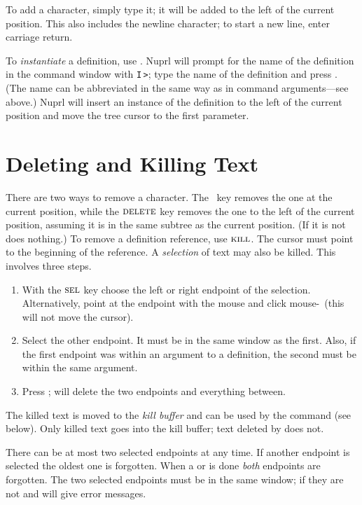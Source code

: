 {}To add a character, simply type it; it will be added to the left of the
current position.
This also includes the newline character; to start a new line, enter
carriage return.

To {\em instantiate}{} a definition, use \INS.  Nuprl will prompt for the name of
the definition in the command window with {\tt I$\,$>}; type the name of the definition
and press \CR.  (The name can be abbreviated in the same way as in command
arguments---see above.)  Nuprl will insert an instance of the definition to the
left of the current position and move the tree cursor to the first
parameter.

\section{Deleting and Killing Text}

There are two ways to remove a character.
The \KILL\ key removes the one at the current position,
while
the $\mbox{\sc delete}${} key removes the one to the left of the current position,
assuming it is in the same subtree as the current position.
(If it is not \DEL{} does nothing.)
To remove a definition reference, use $\mbox{\sc kill}${}.{}
The cursor{} must point to the beginning of the reference.
A {\em selection}{} of text may also be killed.
This involves three steps.
\begin {enumerate}
\item With the $\mbox{\sc sel}$ key choose the left or right endpoint of
    the selection.  Alternatively, point at the endpoint with the
    mouse and click mouse-\SEL\ (this will not move the cursor).

\item Select the other endpoint.
    It must be in the same window as the first.
    Also, if the first endpoint was within an argument to a definition,
    the second must be within the same argument.

\item Press \KILL; \prl{} will delete the two endpoints and everything between.
\end {enumerate}

The killed text is moved to the {\em kill{} buffer}
and can be used by the \COPY{} command (see below).
Only killed text goes into the kill buffer; text deleted by \DEL{} does not.

There can be at most two selected endpoints at any time.
If another endpoint is selected the oldest one is forgotten.
When a \KILL{} or \COPY{} is done {\em both} endpoints are forgotten.
The two selected endpoints must be in the same window;
if they are not \KILL{} and \COPY{} will give error messages.

